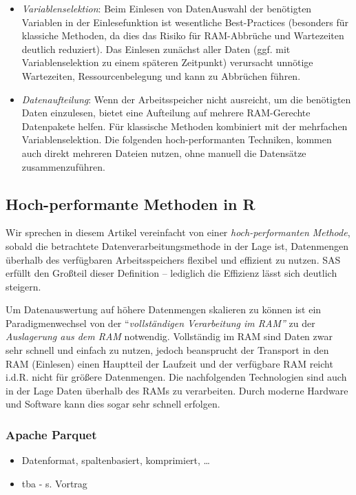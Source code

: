 \documentclass[
  german,
  10pt,
  twoside]{article}
\providecommand{\tightlist}{%
  \setlength{\itemsep}{0pt}\setlength{\parskip}{0pt}}
\begin{document}
\begin{itemize}
\tightlist
\item
  \emph{Variablenselektion}: Beim Einlesen von DatenAuswahl der
  benötigten Variablen in der Einlesefunktion ist wesentliche
  Best-Practices (besonders für klassiche Methoden, da dies das Risiko
  für RAM-Abbrüche und Wartezeiten deutlich reduziert). Das Einlesen
  zunächst aller Daten (ggf. mit Variablenselektion zu einem späteren
  Zeitpunkt) verursacht unnötige Wartezeiten, Ressourcenbelegung und
  kann zu Abbrüchen führen.
\item
  \emph{Datenaufteilung}: Wenn der Arbeitsspeicher nicht ausreicht, um
  die benötigten Daten einzulesen, bietet eine Aufteilung auf mehrere
  RAM-Gerechte Datenpakete helfen. Für klassische Methoden kombiniert
  mit der mehrfachen Variablenselektion. Die folgenden hoch-performanten
  Techniken, kommen auch direkt mehreren Dateien nutzen, ohne manuell
  die Datensätze zusammenzuführen.
\end{itemize}

\subsection{Hoch-performante Methoden in R}\label{sec-highperf}

Wir sprechen in diesem Artikel vereinfacht von einer
\emph{hoch-performanten Methode}, sobald die betrachtete
Datenverarbeitungsmethode in der Lage ist, Datenmengen überhalb des
verfügbaren Arbeitsspeichers flexibel und effizient zu nutzen. SAS
erfüllt den Großteil dieser Definition -- lediglich die Effizienz lässt
sich deutlich steigern.

Um Datenauswertung auf höhere Datenmengen skalieren zu können ist ein
Paradigmenwechsel von der ``\emph{vollständigen Verarbeitung im RAM''}
zu der \emph{Auslagerung aus dem RAM} notwendig. Vollständig im RAM sind
Daten zwar sehr schnell und einfach zu nutzen, jedoch beansprucht der
Transport in den RAM (Einlesen) einen Hauptteil der Laufzeit und der
verfügbare RAM reicht i.d.R. nicht für größere Datenmengen. Die
nachfolgenden Technologien sind auch in der Lage Daten überhalb des RAMs
zu verarbeiten. Durch moderne Hardware und Software kann dies sogar sehr
schnell erfolgen.

\subsubsection{Apache Parquet}\label{apache-parquet}

\begin{itemize}
\tightlist
\item
  Datenformat, spaltenbasiert, komprimiert, \ldots{}
\item
  tba - s. Vortrag
\end{itemize}
\end{document}
